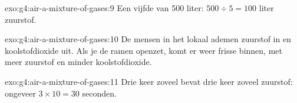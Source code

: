 \begin{solution}{exo:g4:air-a-mixture-of-gases:9}
Een vijfde van 500 liter: $500 \div 5 = 100$ liter zuurstof.
\end{solution}

\begin{solution}{exo:g4:air-a-mixture-of-gases:10}
De mensen in het lokaal ademen zuurstof in en koolstofdioxide uit. Als
je de ramen openzet, komt er weer frisse  binnen, met meer zuurstof
en minder koolstofdioxide.
\end{solution}

\begin{solution}{exo:g4:air-a-mixture-of-gases:11}
Drie keer zoveel  bevat drie keer zoveel zuurstof: ongeveer
$3 \times 10 = 30$ seconden.
\end{solution}
